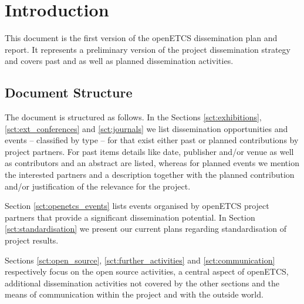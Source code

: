 ﻿\section{Introduction}

This document is the first version of the openETCS dissemination plan and report. It represents a preliminary version of the project dissemination strategy and covers past and as well as planned dissemination activities.

\subsection{Document Structure}

The document is structured as follows. In the Sections \ref{sct:exhibitions}, \ref{sct:ext_conferences} and \ref{sct:journals} we list dissemination opportunities and events -- classified by type -- for that exist either past or planned contributions by project partners. For past items details like date, publisher and/or venue as well as contributors and an abstract are listed, whereas for planned events we mention the interested partners and a description together with the planned contribution and/or justification of the relevance for the project.

Section \ref{sct:openetcs_events} lists events organised by openETCS project partners that provide a significant dissemination potential. In Section \ref{sct:standardisation} we present our current plans regarding standardisation of project results.

Sections \ref{sct:open_source}, \ref{sct:further_activities} and \ref{sct:communication} respectively focus on the open source activities, a central aspect of openETCS, additional dissemination activities not covered by the other sections and the means of communication within the project and with the outside world.
